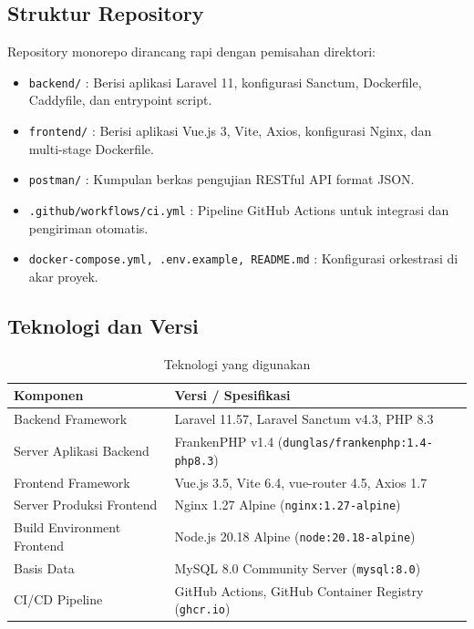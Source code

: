\documentclass[11pt,a4paper]{article}
\begin{document}
\subsection{Struktur Repository}
Repository monorepo dirancang rapi dengan pemisahan direktori:
\begin{itemize}
    \item \texttt{backend/} : Berisi aplikasi Laravel 11, konfigurasi Sanctum, Dockerfile, Caddyfile, dan entrypoint script.
    \item \texttt{frontend/} : Berisi aplikasi Vue.js 3, Vite, Axios, konfigurasi Nginx, dan multi-stage Dockerfile.
    \item \texttt{postman/} : Kumpulan berkas pengujian RESTful API format JSON.
    \item \texttt{.github/workflows/ci.yml} : Pipeline GitHub Actions untuk integrasi dan pengiriman otomatis.
    \item \texttt{docker-compose.yml, .env.example, README.md} : Konfigurasi orkestrasi di akar proyek.
\end{itemize}

\subsection{Teknologi dan Versi}
\begin{table}[H]
\centering
\caption{Teknologi yang digunakan}
\begin{tabular}{ll}
\toprule
\textbf{Komponen} & \textbf{Versi / Spesifikasi} \\
\midrule
Backend Framework & Laravel 11.57, Laravel Sanctum v4.3, PHP 8.3 \\
Server Aplikasi Backend & FrankenPHP v1.4 (\texttt{dunglas/frankenphp:1.4-php8.3}) \\
Frontend Framework & Vue.js 3.5, Vite 6.4, vue-router 4.5, Axios 1.7 \\
Server Produksi Frontend & Nginx 1.27 Alpine (\texttt{nginx:1.27-alpine}) \\
Build Environment Frontend & Node.js 20.18 Alpine (\texttt{node:20.18-alpine}) \\
Basis Data & MySQL 8.0 Community Server (\texttt{mysql:8.0}) \\
CI/CD Pipeline & GitHub Actions, GitHub Container Registry (\texttt{ghcr.io}) \\
\bottomrule
\end{tabular}
\end{table}

\newpage
\end{document}
